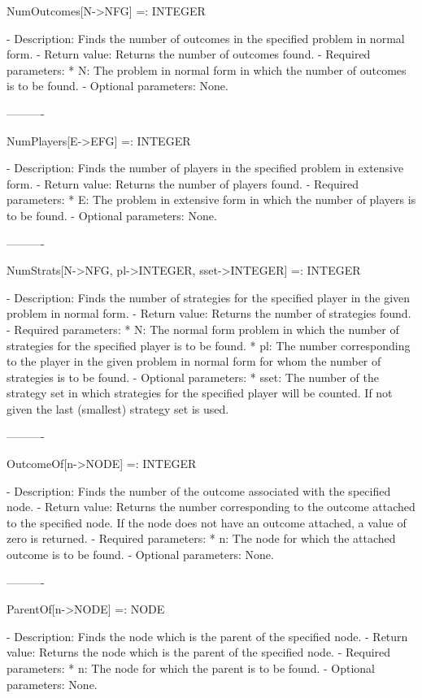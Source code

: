NumOutcomes[N->NFG] =: INTEGER

   -	Description:  Finds the number of outcomes in the specified problem in
	normal form.
   -	Return value:  Returns the number of outcomes found.
   -	Required parameters:
	  *  N:  The problem in normal form in which the number of outcomes is
		to be found.
   -	Optional parameters:  None.

----------

NumPlayers[E->EFG] =: INTEGER

   -	Description:  Finds the number of players in the specified problem in
	extensive form.
   -	Return value:  Returns the number of players found.
   -	Required parameters:
	  *  E:  The problem in extensive form in which the number of players
		is to be found.
   -	Optional parameters:  None.

----------

NumStrats[N->NFG, pl->INTEGER, {sset->INTEGER}] =: INTEGER

   -	Description:  Finds the number of strategies for the specified player 
	in the given problem in normal form.
   -	Return value:  Returns the number of strategies found.
   -	Required parameters:
	  *  N:  The normal form problem in which the number of strategies for
		the specified player is to be found.
	  *  pl:  The number corresponding to the player in the given problem 
		in normal form for whom the number of strategies is to be
		found.
   -	Optional parameters:
	  *  sset:  The number of the strategy set in which strategies for the
		specified player will be counted.  If not given the last
		(smallest) strategy set is used.

----------

OutcomeOf[n->NODE] =: INTEGER

   -	Description:  Finds the number of the outcome associated with the 
	specified node.
   -	Return value:  Returns the number corresponding to the outcome attached
	to the specified node.  If the node does not have an outcome attached,
	a value of zero is returned.
   -	Required parameters:
	  *  n:  The node for which the attached outcome is to be found.
   -	Optional parameters:  None.

----------

ParentOf[n->NODE] =: NODE

   -	Description:  Finds the node which is the parent of the specified node.
   -	Return value:  Returns the node which is the parent of the specified
	node.
   -	Required parameters:
	  *  n:  The node for which the parent is to be found.
   -	Optional parameters:  None.

